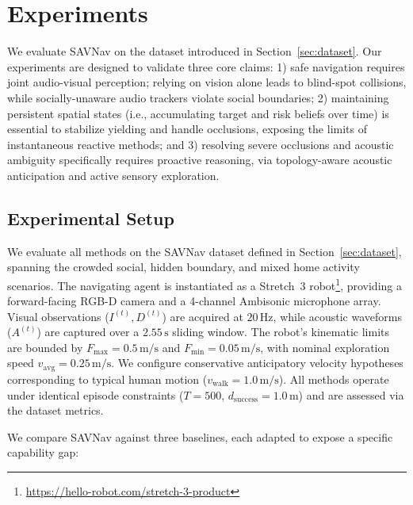 \section{Experiments}
\label{sec:experiments}

We evaluate SAVNav on the dataset introduced in Section~\ref{sec:dataset}. Our experiments are designed to validate three core claims: 1) safe navigation requires joint audio-visual perception; relying on vision alone leads to blind-spot collisions, while socially-unaware audio trackers violate social boundaries; 2) maintaining persistent spatial states (i.e., accumulating target and risk beliefs over time) is essential to stabilize yielding and handle occlusions, exposing the limits of instantaneous reactive methods; and 3) resolving severe occlusions and acoustic ambiguity specifically requires proactive reasoning, via topology-aware acoustic anticipation and active sensory exploration.

\subsection{Experimental Setup}
\label{subsec:exp-setup}

We evaluate all methods on the SAVNav dataset defined in Section~\ref{sec:dataset}, spanning the crowded social, hidden boundary, and mixed home activity scenarios. The navigating agent is instantiated as a Stretch~3 robot\footnote{\url{https://hello-robot.com/stretch-3-product}}, providing a forward-facing RGB-D camera and a 4-channel Ambisonic microphone array. Visual observations ($I^{(t)}, D^{(t)}$) are acquired at $20\,\mathrm{Hz}$, while acoustic waveforms ($A^{(t)}$) are captured over a $2.55\,\mathrm{s}$ sliding window. The robot's kinematic limits are bounded by $F_{\max}=0.5\,\mathrm{m/s}$ and $F_{\min}=0.05\,\mathrm{m/s}$, with nominal exploration speed $v_{\mathrm{avg}}=0.25\,\mathrm{m/s}$. We configure conservative anticipatory velocity hypotheses corresponding to typical human motion ($v_{\mathrm{walk}}=1.0\,\mathrm{m/s}$). All methods operate under identical episode constraints ($T=500$, $d_{\mathrm{success}}=1.0\,\mathrm{m}$) and are assessed via the dataset metrics.

We compare SAVNav against three baselines, each adapted to expose a specific capability gap:


